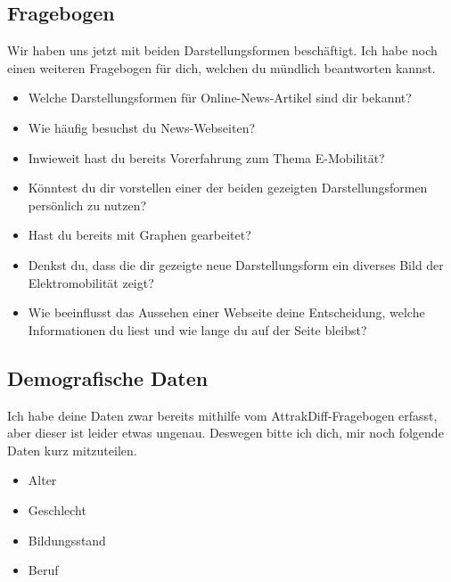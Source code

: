 \subsection{Fragebogen}
Wir haben uns jetzt mit beiden Darstellungsformen beschäftigt.
Ich habe noch einen weiteren Fragebogen für dich, welchen du mündlich beantworten kannst.
\begin{itemize}
    \item Welche Darstellungsformen für Online-News-Artikel sind dir bekannt?
    \item Wie häufig besuchst du News-Webseiten?
    \item Inwieweit hast du bereits Vorerfahrung zum Thema E-Mobilität?
    \item Könntest du dir vorstellen einer der beiden gezeigten Darstellungsformen persönlich zu nutzen?
    \item Hast du bereits mit Graphen gearbeitet?
    \item Denkst du, dass die dir gezeigte neue Darstellungsform ein diverses Bild der Elektromobilität zeigt?
    \item Wie beeinflusst das Aussehen einer Webseite deine Entscheidung, welche Informationen du liest und wie lange du auf der Seite bleibst?
\end{itemize}

\subsection{Demografische Daten}
Ich habe deine Daten zwar bereits mithilfe vom AttrakDiff-Fragebogen erfasst, aber dieser ist leider etwas ungenau.
Deswegen bitte ich dich, mir noch folgende Daten kurz mitzuteilen.
\begin{itemize}
    \item Alter
    \item Geschlecht
    \item Bildungsstand
    \item Beruf
\end{itemize}
